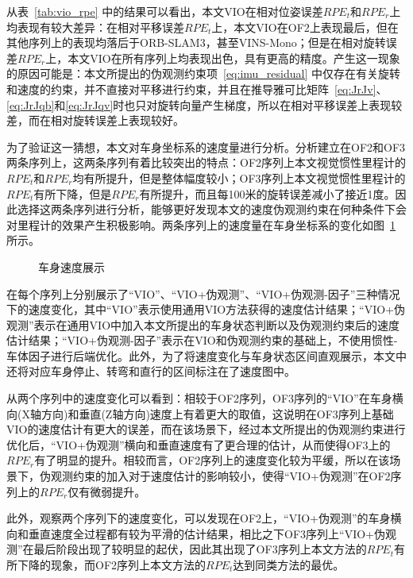 从表~\ref{tab:vio_rpe} 中的结果可以看出，本文VIO在相对位姿误差$RPE_t$和$RPE_r$上均表现有较大差异：在相对平移误差$RPE_t$上，本文VIO在OF2上表现最后，但在其他序列上的表现均落后于ORB-SLAM3，甚至VINS-Mono；但是在相对旋转误差$RPE_r$上，本文VIO在所有序列上均表现出色，具有更高的精度。产生这一现象的原因可能是：本文所提出的伪观测约束项~\eqref{eq:imu_residual} 中仅存在有关旋转和速度的约束，并不直接对平移进行约束，并且在推导雅可比矩阵~\eqref{eq:JrJv}、\eqref{eq:JrJqb}和\eqref{eq:JrJqv}时也只对旋转向量产生梯度，所以在相对平移误差上表现较差，而在相对旋转误差上表现较好。

为了验证这一猜想，本文对车身坐标系的速度量进行分析。分析建立在OF2和OF3两条序列上，这两条序列有着比较突出的特点：OF2序列上本文视觉惯性里程计的$RPE_t$和$RPE_r$均有所提升，但是整体幅度较小；OF3序列上本文视觉惯性里程计的$RPE_t$有所下降，但是$RPE_r$有所提升，而且每100米的旋转误差减小了接近1度。因此选择这两条序列进行分析，能够更好发现本文的速度伪观测约束在何种条件下会对里程计的效果产生积极影响。两条序列上的速度量在车身坐标系的变化如图~\ref{fig:VIO_velocity} 所示。

\begin{figure}
  \centering
  \caption{车身速度展示}
  \label{fig:VIO_velocity}
\end{figure}

在每个序列上分别展示了“VIO”、“VIO+伪观测”、“VIO+伪观测-因子”三种情况下的速度变化，其中“VIO”表示使用通用VIO方法获得的速度估计结果；“VIO+伪观测”表示在通用VIO中加入本文所提出的车身状态判断以及伪观测约束后的速度估计结果；“VIO+伪观测-因子”表示在VIO和伪观测约束的基础上，不使用惯性-车体因子进行后端优化。此外，为了将速度变化与车身状态区间直观展示，本文中还将对应车身停止、转弯和直行的区间标注在了速度图中。

从两个序列中的速度变化可以看到：相较于OF2序列，OF3序列的“VIO”在车身横向(X轴方向)和垂直(Z轴方向)速度上有着更大的取值，这说明在OF3序列上基础VIO的速度估计有更大的误差，而在该场景下，经过本文所提出的伪观测约束进行优化后，“VIO+伪观测”横向和垂直速度有了更合理的估计，从而使得OF3上的$RPE_r$有了明显的提升。相较而言，OF2序列上的速度变化较为平缓，所以在该场景下，伪观测约束的加入对于速度估计的影响较小，使得“VIO+伪观测”在OF2序列上的$RPE_r$仅有微弱提升。

此外，观察两个序列下的速度变化，可以发现在OF2上，“VIO+伪观测”的车身横向和垂直速度全过程都有较为平滑的估计结果，相比之下OF3序列上“VIO+伪观测”在最后阶段出现了较明显的起伏，因此其出现了OF3序列上本文方法的$RPE_t$有所下降的现象，而OF2序列上本文方法的$RPE_t$达到同类方法的最优。

